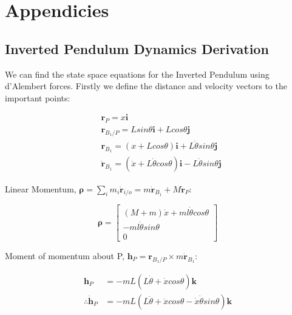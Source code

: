 \documentclass[main.tex]{subfiles}
\begin{document}
\chapter{Appendicies}
\section{Inverted Pendulum Dynamics Derivation}

We can find the state space equations for the Inverted Pendulum using d'Alembert forces. Firstly we define the distance and velocity vectors to the important points:

\begin{align*}
    & \boldsymbol{r}_P = x \boldsymbol{i} \\
    & \boldsymbol{r}_{B_1/P} = Lsin \theta \boldsymbol{i} + Lcos \theta \boldsymbol{j} \\
    & \boldsymbol{r}_{B_1} = (x+Lcos \theta)\boldsymbol{i}+L \dot{\theta} sin \theta  \boldsymbol{j} \\
    & \dot{\boldsymbol{r}}_{B_1} = (\dot{x} + L\dot{\theta}cos\theta)\boldsymbol{i} - L\dot{\theta}sin\theta \boldsymbol{j}
\end{align*}

Linear Momentum, $\boldsymbol{\rho} = \sum_i m_i \dot{\boldsymbol{r}}_{i/o} = m \dot{\boldsymbol{r}}_{B_1} + M \dot{\boldsymbol{r}}_{P}$:

\begin{equation*}
\boldsymbol{\rho} = 
\begin{bmatrix} (M+m)\dot{x} + ml\dot{\theta}cos{\theta} \\ -ml\dot{\theta}sin{\theta} \\ 0 \end{bmatrix} 
\end{equation*}

Moment of momentum about P, $\boldsymbol{h}_P = \boldsymbol{r}_{B_1/P} \times m\boldsymbol{\dot{r}}_{B_1}$:

\begin{align*}
\boldsymbol{h}_P & = -mL(L\dot{\theta} + \dot{x}cos\theta) \boldsymbol{k} \\
\therefore \boldsymbol{\dot{h}}_P & = -mL(L\ddot{\theta} + \ddot{x}cos\theta - \dot{x}\dot{\theta}sin\theta) \boldsymbol{k}
\end{align*}
\end{document}
